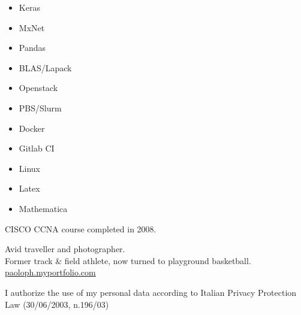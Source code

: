 %
\smallskip

\divider
{}


\smallskip

\smallskip


\smallskip
{}
\smallskip

\smallskip

\smallskip

\begin{multicols}{2}
   \noindent
\begin{itemize}[noitemsep,topsep=0pt]
\item Keras
\item MxNet
\item Pandas
\item BLAS/Lapack
\item Openstack
\item PBS/Slurm
\item Docker
\item Gitlab CI
\item Linux
\item Latex
\item Mathematica
\end{itemize}
\end{multicols}

\smallskip
CISCO CCNA course completed in 2008.

Avid traveller and photographer.\\
Former track \& field athlete, now turned to playground basketball.\\
\medskip
\faCamera \hspace{0.4pc} \url{paoloph.myportfolio.com}

\divider

{\color{gray} \footnotesize I authorize the use of my personal data according to Italian Privacy Protection Law (30/06/2003, n.196/03)}
